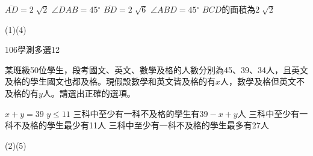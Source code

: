 \begin{QUESTIONS}
\begin{QUESTION}
\begin{QBODY}
        \begin{QOPS}
        \QOP $\overline{AD}=2\sqrt[{}]{2}$
        \QOP $\angle DAB=45{}^\circ $
        \QOP $\overline{BD}=2\sqrt[{}]{6}$
        \QOP $\angle ABD=45{}^\circ $
        \QOP $BCD$的面積為$2\sqrt[{}]{2}$
        \end{QOPS}
        \end{QBODY}
        \begin{QFROMS}
        \end{QFROMS}
        \begin{QTAGS}
        \end{QTAGS}
        \begin{QANS}
            (1)(4)
        \end{QANS}
        \begin{QSOL}
        \end{QSOL}
        \begin{QEMPTYSPACE}
        \end{QEMPTYSPACE}
    \end{QUESTION}
    \begin{QUESTION}
        \begin{ExamInfo}{106}{學測}{多選}{12}
        \end{ExamInfo}
        \begin{QBODY}
            某班級50位學生，段考國文、英文、數學及格的人數分別為45、39、34人，且英文及格的學生國文也都及格。現假設數學和英文皆及格的有$x$人，數學及格但英文不及格的有$y$人。請選出正確的選項。
        \begin{QOPS}
            \QOP $x+y=39$
            \QOP $y\le 11$
            \QOP 三科中至少有一科不及格的學生有$39-x+y$人
            \QOP 三科中至少有一科不及格的學生最少有11人
            \QOP 三科中至少有一科不及格的學生最多有27人
        \end{QOPS}
        \end{QBODY}
        \begin{QFROMS}
        \end{QFROMS}
        \begin{QTAGS}
        \end{QTAGS}
        \begin{QANS}
            (2)(5)
        \end{QANS}
        \begin{QSOL}

\end{QSOL}
\end{QUESTION}
\end{QUESTIONS}
